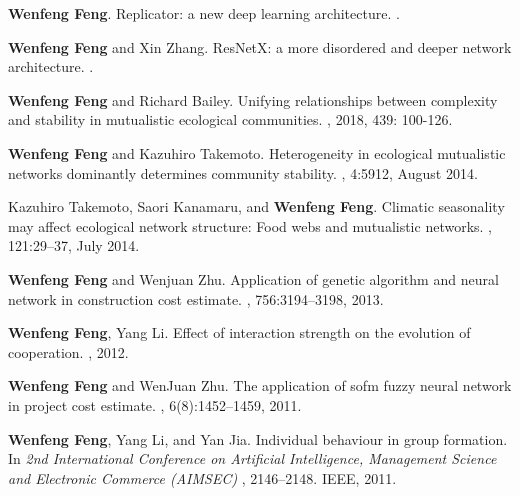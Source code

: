 \documentclass[11pt,a4paper,sans]{moderncv}        %
\begin{document}
\renewcommand{\bibliographyitemlabel}{{\arabic{enumiv}}}
\nocite{*}
\begin{thebibliography}{10}

\textbf{Wenfeng Feng}.
\newblock Replicator: a new deep learning architecture.
.

\textbf{Wenfeng Feng} and Xin Zhang.
\newblock ResNetX: a more disordered and deeper network architecture.
.

\textbf{Wenfeng Feng} and Richard Bailey.
\newblock Unifying relationships between complexity and stability in mutualistic ecological communities.
, 2018, 439: 100-126.

\textbf{Wenfeng Feng} and Kazuhiro Takemoto.
\newblock Heterogeneity in ecological mutualistic networks dominantly
  determines community stability.
, 4:5912, August 2014.

Kazuhiro Takemoto, Saori Kanamaru, and \textbf{Wenfeng Feng}.
\newblock Climatic seasonality may affect ecological network structure: Food
  webs and mutualistic networks.
, 121:29--37, July 2014.

\textbf{Wenfeng Feng} and Wenjuan Zhu.
\newblock Application of genetic algorithm and neural network in construction
  cost estimate.
, 756:3194--3198, 2013.

\textbf{Wenfeng Feng}, Yang Li.
\newblock Effect of interaction strength on the evolution of cooperation.
, 2012.

\textbf{Wenfeng Feng} and WenJuan Zhu.
\newblock The application of sofm fuzzy neural network in project cost
  estimate.
, 6(8):1452--1459, 2011.

\textbf{Wenfeng Feng}, Yang Li, and Yan Jia.
\newblock Individual behaviour in group formation.
\newblock In {\em 2nd International Conference on Artificial Intelligence, Management Science and Electronic Commerce (AIMSEC) }, 2146--2148. IEEE, 2011.


\end{thebibliography}
\end{document}
